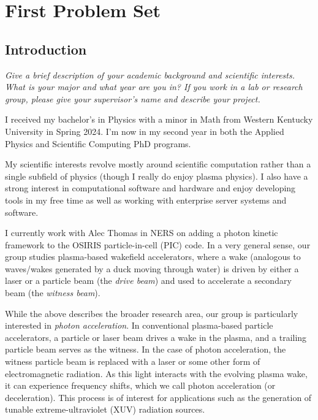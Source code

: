 \section{First Problem Set}
\subsection{Introduction}
\textit{Give a brief description of your academic background and scientific interests. What is your major and what year are you in? If you work in a lab or research group, please give your supervisor's name and describe your project.}
\vspace{1em}

I received my bachelor's in Physics with a minor in Math from Western Kentucky University in Spring 2024. I'm now in my second year in both the Applied Physics and Scientific Computing PhD programs.
\vspace{1em}

My scientific interests revolve mostly around scientific computation rather than a single subfield of physics (though I really do enjoy plasma physics). I also have a strong interest in computational software and hardware and enjoy developing tools in my free time as well as working with enterprise server systems and software.
\vspace{1em}

I currently work with Alec Thomas in NERS on adding a photon kinetic framework to the OSIRIS particle-in-cell (PIC) code. In a very general sense, our group studies plasma-based wakefield accelerators, where a wake (analogous to waves/wakes generated by a duck moving through water) is driven by either a laser or a particle beam (the \textit{drive beam}) and used to accelerate a secondary beam (the \textit{witness beam}). 
\vspace{1em}

While the above describes the broader research area, our group is particularly interested in \textit{photon acceleration}. In conventional plasma-based particle accelerators, a particle or laser beam drives a wake in the plasma, and a trailing particle beam serves as the witness. In the case of photon acceleration, the witness particle beam is replaced with a laser or some other form of electromagnetic radiation. As this light interacts with the evolving plasma wake, it can experience frequency shifts, which we call photon acceleration (or deceleration). This process is of interest for applications such as the generation of tunable extreme-ultraviolet (XUV) radiation sources.
\vspace{1em}

